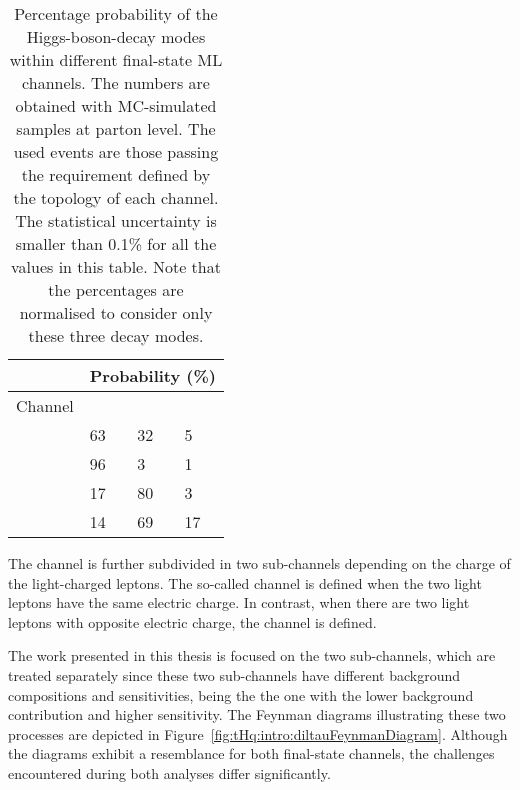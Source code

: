 \begin{table}[h]
\centering
\begin{tabular}{l|lll}
\cline{2-4}
 &\multicolumn{3}{c}{Probability (\%)}     \\ 
\midrule
Channel  	& \Htautau & \HWW	& \HZZ \\
\midrule
\dileptau 	& 63      	& 32  	& 5   \\
\lepditau 	& 96      	& 3   		& 1   \\
\dilepSS  	& 17      	& 80  	& 3   \\
\trilep   	& 14      	& 69  	& 17 \\
\bottomrule	
\end{tabular}
\caption{Percentage probability of the Higgs-boson-decay modes 
within different final-state ML channels. The numbers are obtained with 
MC-simulated samples at parton level.
The used events are those passing the requirement defined by the topology of each channel. 
The statistical uncertainty is smaller than 0.1\% for all the values in this table.
Note that the percentages are normalised to consider only these three decay modes.}
\label{tab:ChaptH:tHqChannelsYields}
\end{table}

The \dileptau channel is further subdivided in two sub-channels depending 
on the charge of the light-charged leptons.
The so-called \dilepSStau channel is defined when the two 
light leptons have the same electric charge. In contrast, when there are two light leptons with opposite electric charge,
the \dilepOStau channel is defined. %


The work presented in this thesis is focused on the two \dileptau sub-channels, which are
treated separately since these two sub-channels have different background compositions and sensitivities, being the \dilepSStau
the one with the lower background contribution and higher sensitivity. The Feynman diagrams illustrating these two 
processes are depicted in Figure~\ref{fig:tHq:intro:diltauFeynmanDiagram}. Although the 
diagrams exhibit a resemblance for both final-state channels, the challenges encountered 
during both analyses differ significantly.

